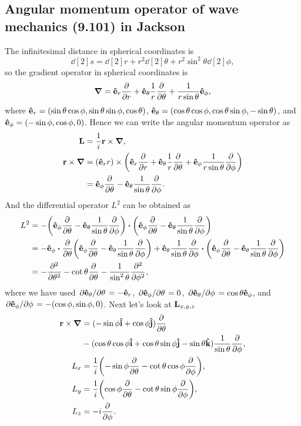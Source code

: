 \documentclass[10pt]{article}
\begin{document}
\subsection{Angular momentum operator of wave mechanics (9.101) in Jackson}
The infinitesimal distance in spherical coordinates is
\begin{equation}
	\dd[2]{s} = \dd[2]{r} + r^2 \dd[2]{\theta} + r^2 \sin^2{\theta} \dd[2]{\phi},
\end{equation}
so the gradient operator in spherical coordinates is
\begin{equation}
	\grad = \vu{e}_r \pdv{r} + \vu{e}_{\theta} \frac{1}{r} \pdv{\theta} + \frac{1}{r \sin{\theta}} \vu{e}_{\phi},
\end{equation}
where $\vu{e}_r = (\sin{\theta}\cos{\phi}, \sin{\theta}\sin{\phi}, \cos{\theta})$, $\vu{e}_{\theta} = (\cos{\theta} \cos{\phi}, \cos{\theta} \sin{\phi}, - \sin{\theta})$,
and $\vu{e}_{\phi} = (-\sin{\phi}, \cos{\phi}, 0)$.
Hence we can write the angular momentum operator as
\begin{align*}
	\vb{L} &= \frac{1}{i} \vb{r} \times \grad, \\
	\vb{r} \times \grad &= (\vu{e}_r r) \times \qty(\vu{e}_r \pdv{r} + \vu{e}_{\theta} \frac{1}{r} \pdv{\theta} + \vu{e}_{\phi} \frac{1}{r \sin{\theta}} \pdv{\phi}) \\
	&= \vu{e}_{\phi} \pdv{\theta} - \vu{e}_{\theta} \frac{1}{\sin{\theta}} \pdv{\phi}.
\end{align*}
And the differential operator $L^2$ can be obtained as
\begin{align*}
	L^2 &= -\qty(\vu{e}_{\phi} \pdv{\theta} - \vu{e}_{\theta} \frac{1}{\sin{\theta}} \pdv{\phi}) \vdot \qty(\vu{e}_{\phi} \pdv{\theta} - \vu{e}_{\theta} \frac{1}{\sin{\theta}} \pdv{\phi}) \\
	&= - \vu{e}_{\phi} \vdot \pdv{\theta} \qty(\vu{e}_{\phi} \pdv{\theta} - \vu{e}_{\theta} \frac{1}{\sin{\theta}} \pdv{\phi})
	+ \vu{e}_{\theta} \frac{1}{\sin{\theta}} \pdv{\phi} \vdot \qty(\vu{e}_{\phi} \pdv{\theta} - \vu{e}_{\theta} \frac{1}{\sin{\theta}} \pdv{\phi}) \\
	&= -\pdv[2]{\theta} - \cot{\theta} \pdv{\theta} -\frac{1}{\sin^2{\theta}} \pdv[2]{\phi},
\end{align*}
where we have used $\pdv*{\vu{e}_{\theta}}{\theta} = -\vu{e}_r$, $\pdv*{\vu{e}_{\phi}}{\theta} = 0$, $\pdv*{\vu{e}_{\theta}}{\phi} = \cos{\theta} \vu{e}_{\phi}$,
and $\pdv*{\vu{e}_{\phi}}{\phi} = -(\cos{\phi}, \sin{\phi}, 0)$.
Next let's look at $\vb{L}_{x,y,z}$
\begin{align*}
	\vb{r} \times \grad &= (-\sin{\phi} \vu{i} + \cos{\phi} \vu{j}) \pdv{\theta} \\
	&- (\cos{\theta} \cos{\phi} \vu{i} + \cos{\theta} \sin{\phi} \vu{j} - \sin{\theta} \vu{k}) \frac{1}{\sin{\theta}} \pdv{\phi}, \\
	L_x &= \frac{1}{i}\qty(-\sin{\phi}\pdv{\theta} - \cot{\theta}\cos{\phi}\pdv{\phi}), \\
	L_y &= \frac{1}{i}\qty(\cos{\phi}\pdv{\theta} - \cot{\theta}\sin{\phi}\pdv{\phi}), \\
	L_z &= -i\pdv{\phi}.
\end{align*}
\end{document}
